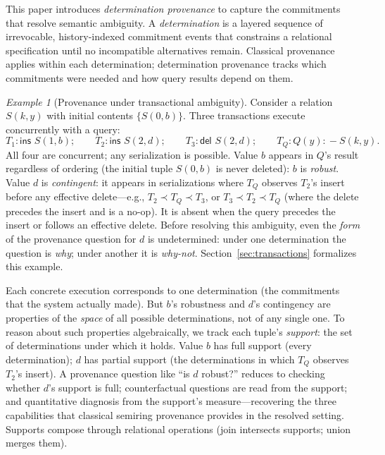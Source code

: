 \documentclass[acmsmall,review,anonymous]{acmart}
\newcommand{\drule}{\mathrel{:\!-}}
\theoremstyle{remark}
\newtheorem{example}{Example}
\numberwithin{definition}{section}
\numberwithin{theorem}{section}
\numberwithin{lemma}{section}
\numberwithin{corollary}{section}
\numberwithin{remark}{section}
\numberwithin{example}{section}
\numberwithin{observation}{section}
\numberwithin{assumption}{section}
\begin{document}
This paper introduces \emph{determination provenance} to capture the
commitments that resolve semantic ambiguity.
A \emph{determination} is a layered sequence of irrevocable,
history-indexed
commitment events that constrains a relational specification until no
incompatible alternatives remain.
Classical provenance applies within each determination; determination
provenance tracks which commitments were needed and how query results
depend on them.

\begin{example}[Provenance under transactional ambiguity]
  \label{ex:example}
  Consider a relation $S(k,y)$ with initial contents $\{S(0,b)\}$.
  Three transactions execute concurrently with a query:
  \[
    T_1\!: \textsf{ins } S(1,b);\qquad
    T_2\!: \textsf{ins } S(2,d);\qquad
    T_3\!: \textsf{del } S(2,d);\qquad
    T_Q\!: Q(y) \drule S(k,y).
  \]
  All four are concurrent; any serialization is possible.
  Value $b$ appears in $Q$'s result regardless of ordering
  (the initial tuple $S(0,b)$ is never deleted): $b$ is \emph{robust}.
  Value $d$ is \emph{contingent}: it appears in serializations where
  $T_Q$ observes $T_2$'s insert before any effective delete---e.g.,
  $T_2 \prec T_Q \prec T_3$, or $T_3 \prec T_2 \prec T_Q$ (where the
  delete precedes the insert and is a no-op).
  It is absent when the query precedes the insert or follows an
  effective delete.
  Before resolving this ambiguity, even the \emph{form} of the
  provenance question for $d$ is undetermined: under one determination
  the question is \emph{why}; under another it is \emph{why-not}.
  Section~\ref{sec:transactions} formalizes this example.
\end{example}

\noindent
Each concrete execution corresponds to one determination (the
commitments that the system actually made).
But $b$'s robustness and $d$'s contingency are properties of the
\emph{space} of all possible determinations, not of any single one.
To reason about such properties algebraically, we track each tuple's
\emph{support}: the set of determinations under which it holds.
Value $b$ has full support (every determination); $d$ has partial
support (the determinations in which $T_Q$
observes $T_2$'s insert).
A provenance question like ``is $d$ robust?'' reduces to checking
whether $d$'s support is full; counterfactual questions are read from
the support; and quantitative diagnosis from the support's
measure---recovering the three capabilities that classical semiring
provenance provides in the resolved setting.
Supports compose through relational operations (join intersects
supports; union merges them).
\end{document}
